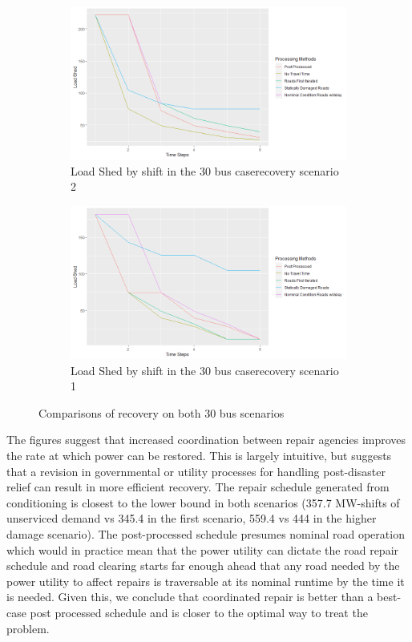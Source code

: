 \documentclass[10pt]{article}
\begin{document}
\begin{figure}
	\centering
	\begin{subfigure}{.5\textwidth}
		\centering
		\includegraphics[width=\linewidth]{Rplot30Scenario2Fixed.png}
		\caption{Load Shed by shift in the 30 bus case\newline recovery scenario 2}
		\label{fig:sub1}
	\end{subfigure}%
	\begin{subfigure}{.5\textwidth}
		\centering
		\includegraphics[width=\linewidth]{Rplot37Fixed.png}
		\caption{Load Shed by shift in the 30 bus case\newline recovery scenario 1}
		\label{fig:sub2}
	\end{subfigure}
	\caption{Comparisons of recovery on both 30 bus scenarios}
\end{figure}
The figures suggest that increased coordination between repair agencies improves the rate at which power can be restored. This is largely intuitive, but suggests that a revision in governmental or utility processes for handling post-disaster relief can result in more efficient recovery. The repair schedule generated from conditioning is closest to the lower bound in both scenarios (357.7 MW-shifts of unserviced demand vs 345.4 in the first scenario, 559.4 vs 444 in the higher damage scenario). The post-processed schedule presumes nominal road operation which would in practice mean that the power utility can dictate the road repair schedule and road clearing starts far enough ahead that any road needed by the power utility to affect repairs is traversable at its nominal runtime by the time it is needed. Given this, we conclude that coordinated repair is better than a best-case post processed schedule and is closer to the optimal way to treat the problem.
\end{document}
